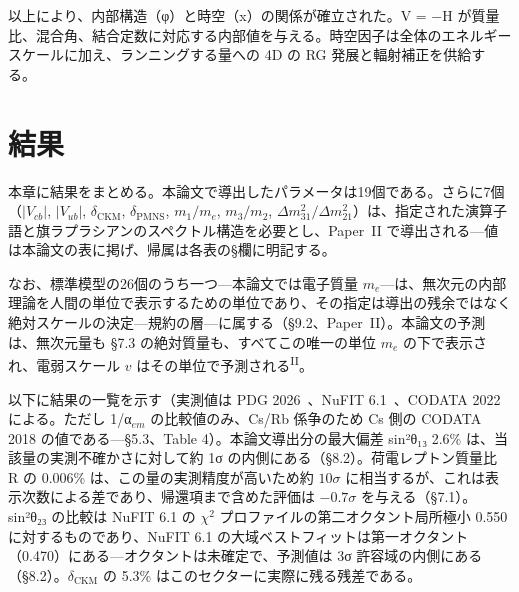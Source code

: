 \documentclass[fontsize=11pt,paper=a4,lualatex]{jlreq}
\newcommand{\PII}{\textsuperscript{\textup{II}}}
\begin{document}
以上により、内部構造（φ）と時空（x）の関係が確立された。V = −H が質量比、混合角、結合定数に対応する内部値を与える。時空因子は全体のエネルギースケールに加え、ランニングする量への 4D の RG 発展と輻射補正を供給する。

\clearpage
\section{結果}\label{ux7d50ux679c}

本章に結果をまとめる。本論文で導出したパラメータは19個である。さらに7個（$|V_{cb}|$, $|V_{ub}|$, $\delta_\mathrm{CKM}$, $\delta_\mathrm{PMNS}$, $m_1/m_e$, $m_3/m_2$, $\Delta m^2_{31}/\Delta m^2_{21}$）は、指定された演算子語と旗ラプラシアンのスペクトル構造を必要とし、Paper~II で導出される---値は本論文の表に掲げ、帰属は各表の§欄に明記する。

なお、標準模型の26個のうち一つ---本論文では電子質量 $m_e$---は、無次元の内部理論を人間の単位で表示するための単位であり、その指定は導出の残余ではなく絶対スケールの決定---規約の層---に属する（§9.2、Paper~II）。本論文の予測は、無次元量も §7.3 の絶対質量も、すべてこの唯一の単位 $m_e$ の下で表示され、電弱スケール $v$ はその単位で予測される\PII{}。

以下に結果の一覧を示す（実測値は PDG 2026~\cite{pdg}、NuFIT 6.1~\cite{nufit}、CODATA 2022~\cite{codata} による。ただし 1/α$_{em}$ の比較値のみ、Cs/Rb 係争のため Cs 側の CODATA 2018 の値である---§5.3、Table 4）。本論文導出分の最大偏差 sin²θ₁₃ 2.6\% は、当該量の実測不確かさに対して約 1σ の内側にある（§8.2）。荷電レプトン質量比 R の 0.006\% は、この量の実測精度が高いため約 $10\sigma$ に相当するが、これは表示次数による差であり、帰還項まで含めた評価は $-0.7\sigma$ を与える（§7.1）。sin²θ₂₃ の比較は NuFIT 6.1 の $\chi^2$ プロファイルの第二オクタント局所極小 0.550 に対するものであり、NuFIT 6.1 の大域ベストフィットは第一オクタント（0.470）にある---オクタントは未確定で、予測値は 3σ 許容域の内側にある（§8.2）。$\delta_\mathrm{CKM}$ の 5.3\% はこのセクターに実際に残る残差である。
\end{document}
